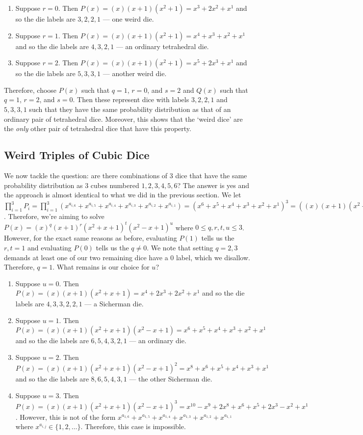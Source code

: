 \documentclass[12pt]{report}
\begin{document}
\begin{enumerate}
\item Suppose $r=0$. Then $P(x)=(x)(x+1)(x^{2}+1)=x^{3}+2x^{2}+x^{1}$ and so the die labels are $3,2,2,1$ --- one weird die.
\item Suppose $r=1$. Then $P(x)=(x)(x+1)(x^{2}+1)=x^{4}+x^{3}+x^{2}+x^{1}$ and so the die labels are $4,3,2,1$ --- an ordinary tetrahedral die.
\item Suppose $r=2$. Then $P(x)=(x)(x+1)(x^{2}+1)=x^{5}+2x^{3}+x^{1}$ and so the die labels are $5,3,3,1$ --- another weird die.
\end{enumerate}

Therefore, choose $P(x)$ such that $q=1$, $r=0$, and $s=2$ and $Q(x)$ such that $q=1$, $r=2$, and $s=0$. Then
these represent dice with labels $3,2,2,1$ and $5,3,3,1$ such that they have the same probability distribution
as that of an ordinary pair of tetrahedral dice. Moreover, this shows that the `weird dice' are the
\textit{only} other pair of tetrahedral dice that have this property.

\subsection*{Weird Triples of Cubic Dice}
We now tackle the question: are there combinations of 3 dice that have the same probability distribution as 3
cubes numbered $1,2,3,4,5,6$? The answer is yes and the approach is almost identical to what we did in the
previous section. We let
$\prod_{i=1}^{3} P_{i}=\prod_{i=1}^{3}(x^{a_{i,6}}+x^{a_{i,5}}+x^{a_{i,4}}+x^{a_{i,3}}+x^{a_{i,2}}+x^{a_{i,1}})=(x^{6}+x^{5}+x^{4}+x^{3}+x^{2}+x^{1})^{3}=((x)(x+1)(x^{2}+x+1)(x^{2}-x+1))^{3}$.
Therefore, we're aiming to solve $P(x)=(x)^{q}(x+1)^{r}(x^{2}+x+1)^{t}(x^{2}-x+1)^{u}$ where
$0\leq q,r,t,u\leq 3$. However, for the exact same reasons as before, evaluating $P(1)$ tells us the $r,t=1$
and evaluating $P(0)$ tells us the $q \neq 0$. We note that setting $q=2,3$ demands at least one of our two
remaining dice have a 0 label, which we disallow. Therefore, $q=1$. What remains is our choice for $u$?

\begin{enumerate}
\item Suppose $u=0$. Then $P(x)=(x)(x+1)(x^{2}+x+1)=x^{4}+2x^{3}+2x^{2}+x^{1}$ and so the die labels are $4,3,3,2,2,1$ --- a Sicherman die.
\item Suppose $u=1$. Then $P(x)=(x)(x+1)(x^{2}+x+1)(x^{2}-x+1)=x^{6}+x^{5}+x^{4}+x^{3}+x^{2}+x^{1}$ and so the die labels are $6,5,4,3,2,1$ --- an ordinary die.
\item Suppose $u=2$. Then $P(x)=(x)(x+1)(x^{2}+x+1)(x^{2}-x+1)^{2}=x^{8}+x^{6}+x^{5}+x^{4}+x^{3}+x^{1}$ and so the die labels are $8,6,5,4,3,1$ --- the other Sicherman die.
\item Suppose $u=3$. Then $P(x)=(x)(x+1)(x^{2}+x+1)(x^{2}-x+1)^{3}=x^{10}-x^{9}+2x^{8}+x^{6}+x^{5}+2x^{3}-x^{2}+x^{1}$. However, this is not of the form $x^{a_{1,6}}+x^{a_{1,5}}+x^{a_{1,4}}+x^{a_{1,3}}+x^{a_{1,2}}+x^{a_{1,1}}$ where $x^{a_{i,j}} \in \{1,2,\ldots\}$. Therefore, this case is impossible.
\end{enumerate}
\end{document}
